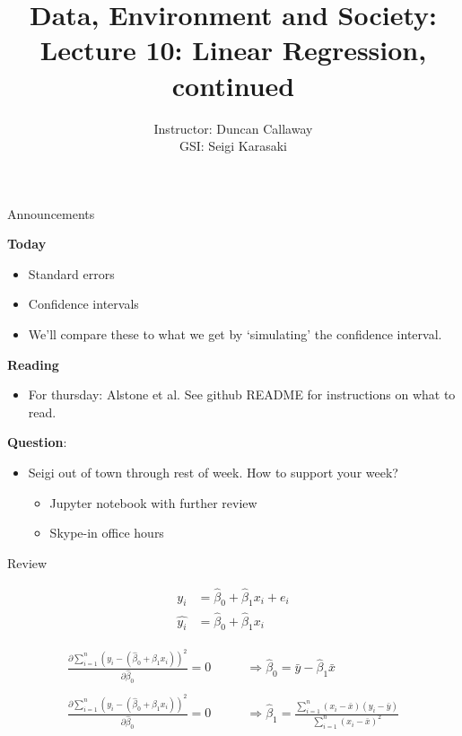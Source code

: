 \documentclass[aspectratio=169]{beamer}
\title[Lecture 10: Regression, continued] %
{Data, Environment and Society: \\{Lecture 10: Linear Regression, continued}}
\author[ER190C: Data, Environment and Society] 
{Instructor: Duncan Callaway\\
GSI: Seigi Karasaki}
\institute[UC Berkeley] %
 {\small{ \bf September 25, 2018}}
\date[September 25, 2018]
\begin{document}
\begin{frame}
  \titlepage
\end{frame}

\begin{frame}{Announcements}

\textbf{Today}
\begin{itemize}
\item Standard errors
\item Confidence intervals 
\item We'll compare these to what we get by `simulating' the confidence interval.
\end{itemize}

\textbf{Reading}
\begin{itemize}
\item For thursday: Alstone et al.  See github README for instructions on what to read.
\end{itemize}

\textbf{Question}:
\begin{itemize}
\item Seigi out of town through rest of week.  How to support your week?
\begin{itemize}
\item Jupyter notebook with further review 
\item Skype-in office hours
\end{itemize}
\end{itemize}

\end{frame}


\begin{frame}{Review}

\begin{align*}
y_i &= \hat{\beta}_0 + \hat{\beta}_1 x_i + e_i\\
\hat{y_i} &= \hat{\beta}_0 + \hat{\beta}_1 x_i
\end{align*}

\begin{align*}
\frac{\partial  \sum_{i=1}^n(y_i - (\hat{\beta}_0 + \hat{\beta}_1 x_i))^2}{\partial \hat{\beta}_0} = 0 \quad\quad &\Rightarrow \hat{\beta}_0  =\bar{y} - \hat{\beta}_1\bar{x}\\\\
\frac{\partial   \sum_{i=1}^n(y_i - (\hat{\beta}_0 + \hat{\beta}_1 x_i))^2}{\partial \hat{\beta}_0} = 0 \quad\quad &\Rightarrow 
\hat{\beta}_1 = \frac{ \sum_{i=1}^n(x_i-\bar{x})(y_i-\bar{y})}{\sum_{i=1}^n (x_i-\bar{x})^2}
\end{align*}

\end{frame}
\end{document}
